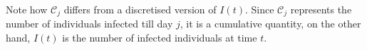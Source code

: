 \documentclass[aps,prd,10pt,twocolumn,nofootinbib]{revtex4-2}
\begin{document}
Note how $\mathscr{C}_j$ differs from a discretised version of $I(t)$. Since $\mathscr{C}_j$
represents the number of individuals infected till day $j$, it is a cumulative quantity, on the other hand, $I(t)$ is the number of infected individuals at time $t$.
\end{document}
